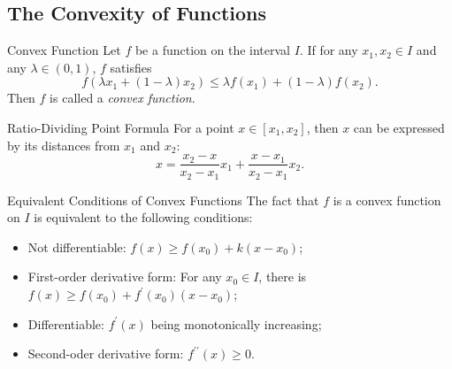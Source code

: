 \subsection{The Convexity of Functions}

\begin{definition}{Convex Function}{}
  Let $f$ be a function on the interval $I$.
  If for any $x_1, x_2 \in I$ and any $\lambda \in (0, 1)$,
  $f$ satisfies
  \begin{equation}
    f \left( \lambda x_1 + (1-\lambda)x_2 \right) \leq \lambda f(x_1) + (1-\lambda)f(x_2).
  \end{equation}
  Then $f$ is called a \emph{convex function}.
\end{definition}

\begin{lemma}{Ratio-Dividing Point Formula}{}
  For a point $x \in [x_1, x_2]$, then $x$ can be expressed by
  its distances from $x_1$ and $x_2$:
  \begin{equation}
    x = \frac{x_2 - x}{x_2 - x_1}x_1 + \frac{x - x_1}{x_2 - x_1}x_2.
  \end{equation}
\end{lemma}

\begin{proposition}{Equivalent Conditions of Convex Functions}{}
  The fact that $f$ is a convex function on $I$ is equivalent to
  the following conditions:
  \begin{itemize}
  \item Not differentiable: $f(x) \geq f(x_0) + k(x - x_0)$;
  \item First-order derivative form: For any $x_0 \in I$,
    there is $f(x) \geq f(x_0) + f^{\prime}(x_0) (x - x_0)$;
  \item Differentiable: $f^{\prime}(x)$ being monotonically increasing;
  \item Second-oder derivative form: $f^{\prime\prime}(x) \geq 0$.
  \end{itemize}
\end{proposition}


